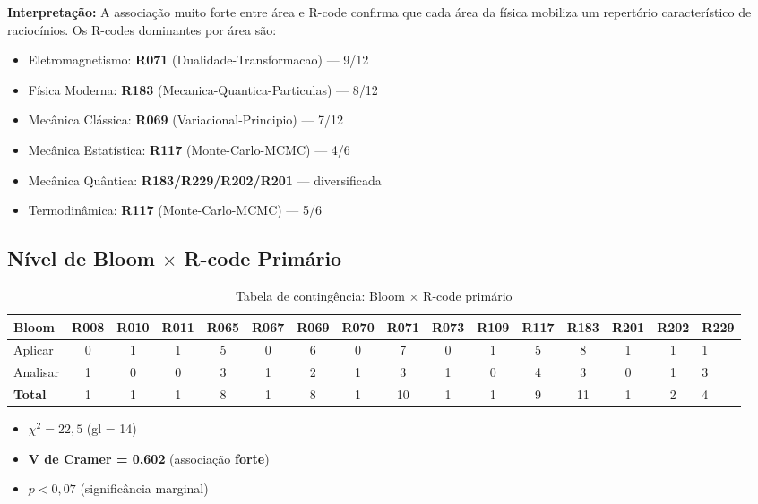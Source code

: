 \documentclass[12pt,a4paper]{article}
\newcommand{\rcode}[1]{\textcolor{azulprof}{\textbf{#1}}}
\begin{document}
\textbf{Interpretação:} A associação muito forte entre área e R-code
confirma que cada área da física mobiliza um repertório característico
de raciocínios. Os R-codes dominantes por área são:
\begin{itemize}
  \item Eletromagnetismo: \rcode{R071} (Dualidade-Transformacao) --- 9/12
  \item Física Moderna: \rcode{R183} (Mecanica-Quantica-Particulas) --- 8/12
  \item Mecânica Clássica: \rcode{R069} (Variacional-Principio) --- 7/12
  \item Mecânica Estatística: \rcode{R117} (Monte-Carlo-MCMC) --- 4/6
  \item Mecânica Quântica: \rcode{R183/R229/R202/R201} --- diversificada
  \item Termodinâmica: \rcode{R117} (Monte-Carlo-MCMC) --- 5/6
\end{itemize}

\subsection{Nível de Bloom $\times$ R-code Primário}

\begin{table}[H]
\centering
\caption{Tabela de contingência: Bloom $\times$ R-code primário}
\label{tab:bloom_rcode}
\begin{tabular}{lcccccccccccccc}
\toprule
\textbf{Bloom} & R008 & R010 & R011 & R065 & R067 & R069 & R070 & R071 & R073 & R109 & R117 & R183 & R201 & R202 & R229 \\
\midrule
Aplicar & 0 & 1 & 1 & 5 & 0 & 6 & 0 & 7 & 0 & 1 & 5 & 8 & 1 & 1 & 1 \\
Analisar & 1 & 0 & 0 & 3 & 1 & 2 & 1 & 3 & 1 & 0 & 4 & 3 & 0 & 1 & 3 \\
\midrule
\textbf{Total} & 1 & 1 & 1 & 8 & 1 & 8 & 1 & 10 & 1 & 1 & 9 & 11 & 1 & 2 & 4 \\
\bottomrule
\end{tabular}
\end{table}

\begin{itemize}
  \item $\chi^2 = 22,5$ (gl = 14)
  \item \textbf{V de Cramer = 0,602} (associação \textbf{forte})
  \item $p < 0,07$ (significância marginal)
\end{itemize}
\end{document}
